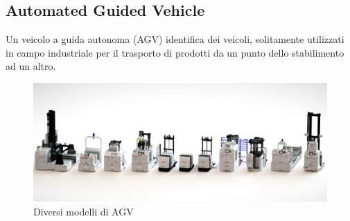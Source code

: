 \documentclass[12pt]{article}
\begin{document}
\newpage

\subsection{Automated Guided Vehicle}
Un veicolo a guida autonoma (AGV) identifica dei veicoli, solitamente utilizzati in campo industriale per il trasporto di prodotti da un punto dello stabilimento ad un altro.\\

\begin{figure}[ht]
\centering
\includegraphics[width=\textwidth,height=\textheight,keepaspectratio]{Figures/Vario/AGV.jpg}
\caption[Diversi modelli di AGV]{Diversi modelli di AGV}
\label{fig:AGV}
\end{figure}
\end{document}
